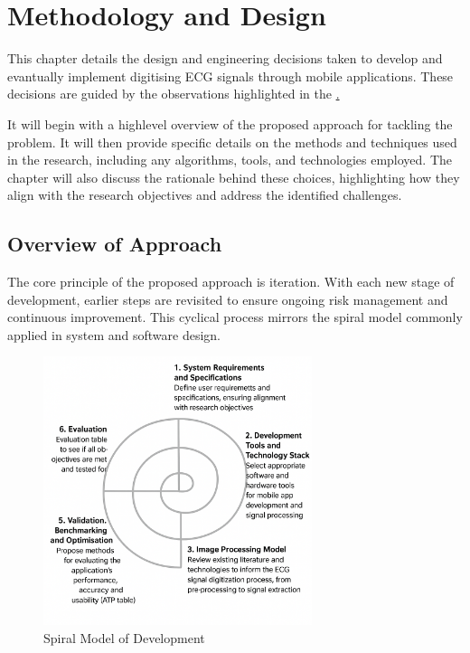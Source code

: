 
\glsresetall %
\chapter[Methodology]{Methodology and Design}\label{ch:Methodology}

This chapter details the design and engineering decisions taken to develop and evantually implement digitising ECG signals through mobile applications. These decisions are guided by the observations highlighted in the \href{ch:LitReview}.

It will begin with a highlevel overview of the proposed approach for tackling the problem. It will then provide specific details on the methods and techniques used in the research, including any algorithms, tools, and technologies employed. The chapter will also discuss the rationale behind these choices, highlighting how they align with the research objectives and address the identified challenges.


\section{Overview of Approach}

The core principle of the proposed approach is iteration. With each new stage of development, earlier steps are revisited to ensure ongoing risk management and continuous improvement. This cyclical process mirrors the spiral model commonly applied in system and software design.

\begin{figure}[H]
    \centering
    \includegraphics[width=0.7\textwidth]{3_Chapters/3_Chapter_Methodology/Figures/Spiral Model.png}
    \caption{Spiral Model of Development}
    \label{fig:SpiralModel}
\end{figure}

